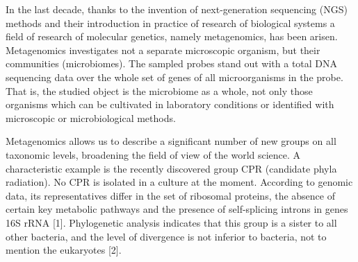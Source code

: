 \documentclass[conference,a4paper]{IEEEtran}
\begin{document}



In the last decade, thanks to the invention of next-generation sequencing (NGS) methods and their introduction in practice of research of biological systems a field of research of molecular genetics, namely metagenomics, has been arisen.  Metagenomics investigates not a separate microscopic organism, but their communities (microbiomes).  The sampled probes stand out with a total DNA sequencing data over the whole set of genes of all microorganisms in the probe.  That is, the studied object is the microbiome as a whole, not only those organisms which can be cultivated in laboratory conditions or identified with microscopic or microbiological methods.

Metagenomics allows us to describe a significant number of new groups on all taxonomic levels, broadening the field of view of the world science.  A characteristic example is the recently discovered group CPR (candidate phyla radiation).  No CPR is isolated in a culture at the moment.  According to genomic data, its representatives differ in the set of ribosomal proteins, the absence of certain key metabolic pathways and the presence of self-splicing introns in genes 16S rRNA [1].  Phylogenetic analysis indicates that this group is a sister to all other bacteria, and the level of divergence is not inferior to bacteria, not to mention the eukaryotes [2].
\end{document}
